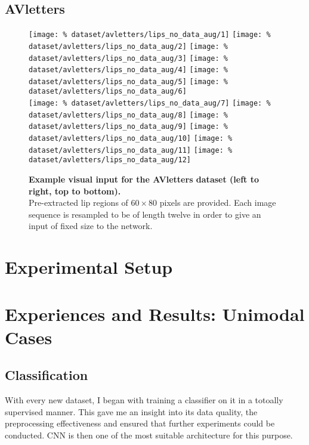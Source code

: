 \subsection{AVletters}

\begin{figure}[H]
  \centering
  \texttt{[image: \%
    dataset/avletters/lips\_no\_data\_aug/1]}
  \texttt{[image: \%
    dataset/avletters/lips\_no\_data\_aug/2]}
  \texttt{[image: \%
    dataset/avletters/lips\_no\_data\_aug/3]}
  \texttt{[image: \%
    dataset/avletters/lips\_no\_data\_aug/4]}
  \texttt{[image: \%
    dataset/avletters/lips\_no\_data\_aug/5]}
  \texttt{[image: \%
    dataset/avletters/lips\_no\_data\_aug/6]}\\[0.15em]
  \texttt{[image: \%
    dataset/avletters/lips\_no\_data\_aug/7]}
  \texttt{[image: \%
    dataset/avletters/lips\_no\_data\_aug/8]}
  \texttt{[image: \%
    dataset/avletters/lips\_no\_data\_aug/9]}
  \texttt{[image: \%
    dataset/avletters/lips\_no\_data\_aug/10]}
  \texttt{[image: \%
    dataset/avletters/lips\_no\_data\_aug/11]}
  \texttt{[image: \%
    dataset/avletters/lips\_no\_data\_aug/12]}
  \caption{%
    \textbf{Example visual input for the AVletters dataset
      (left to right, top to bottom).}\\[0.1em]
    Pre-extracted lip regions of $60 \times 80$ pixels are provided.
      Each image sequence is resampled to be of length twelve in order to
      give an input of fixed size to the network.}
  \label{fig:avletters_exs}
\end{figure}

\section{Experimental Setup}

\section{Experiences and Results: Unimodal Cases}

\subsection{Classification}

With every new dataset, I began with training a classifier on it in a
totoally supervised manner.
This gave me an insight into its data quality, the preprocessing
effectiveness and ensured that further experiments could be conducted.
CNN is then one of the most suitable architecture for this purpose.

